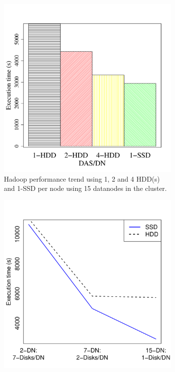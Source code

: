 \documentclass[conference]{IEEEtran}
\begin{document}
\begin{figure}[h]
  \centering
  \begin{subfigure}[b]{0.23\textwidth}
          \includegraphics[width=\textwidth]{Figure/PerormanceData/Plots/SSDHDDSameNode.pdf}
          \caption{Hadoop performance trend using 1, 2 and 4 HDD(s) and 1-SSD per node using 15 datanodes in the cluster.}
          \label{fig:SsdN4Hdd}
  \end{subfigure}
  \begin{subfigure}[b]{0.23\textwidth}
          \includegraphics[width=\textwidth]{Figure/PerormanceData/Plots/SSDHDDDiffNode.pdf}

\end{subfigure}
\end{figure}
\end{document}
